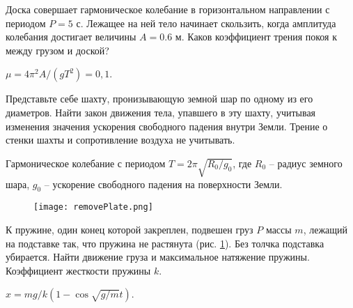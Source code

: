 \begin{ex} %
Доска совершает гармоническое колебание в горизонтальном направлении с периодом $P = 5$ с. Лежащее на ней тело начинает скользить, когда амплитуда колебания достигает величины $A = 0.6$ м. Каков коэффициент трения покоя к между грузом и доской?
\begin{ans}
$\mu = 4 \pi^2 A / (gT^2) = 0,1$.
\end{ans}
\end{ex}	

\complexProblems

\begin{ex} %
Представьте себе шахту, пронизывающую земной шар по одному из его диаметров. Найти закон движения тела, упавшего в эту шахту, учитывая изменения значения ускорения свободного падения внутри Земли. Трение о стенки шахты и сопротивление воздуха не учитывать.
\begin{ans}
Гармоническое колебание с периодом $T = 2 \pi \sqrt{R_0 / g_0}$, где $R_0$ -- радиус земного шара, $g_0$ -- ускорение свободного падения на поверхности Земли.
\end{ans}
\end{ex}	

\begin{figure}[h]
\centering
\texttt{[image: removePlate.png]}
\caption{}
\label{removePlate}
\end{figure}

\begin{ex} %
К пружине, один конец которой закреплен, подвешен груз $P$ массы $m$, лежащий на подставке так, что пружина не растянута (рис. \ref{removePlate}). Без толчка подставка убирается. Найти движение груза и максимальное натяжение пружины. Коэффициент жесткости пружины $k$.
\begin{ans}
$x = mg/k(1-\cos \sqrt{g/m} t)$.
\end{ans}
\end{ex}	

\clearpage